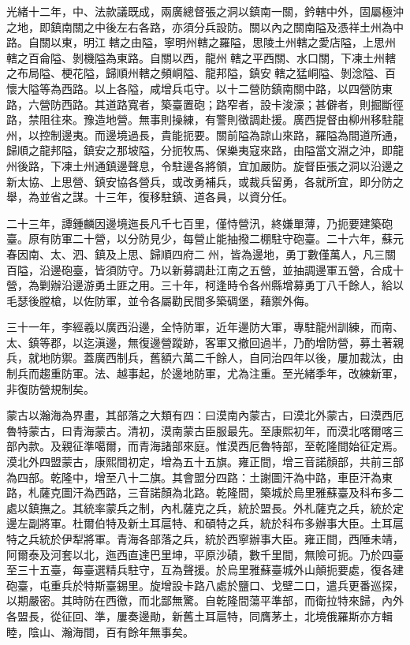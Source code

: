 \begin{pinyinscope}
光緒十二年，中、法款議既成，兩廣總督張之洞以鎮南一關，鈐轄中外，固屬極沖之地，即鎮南關之中後左右各路，亦須分兵設防。關以內之關南隘及憑祥土州為中路。自關以東，明江轄之由隘，寧明州轄之羅隘，思陵土州轄之愛店隘，上思州轄之百侖隘、剝機隘為東路。自關以西，龍州轄之平西關、水口關，下凍土州轄之布局隘、梗花隘，歸順州轄之頻峒隘、龍邦隘，鎮安轄之猛峒隘、剝淰隘、百懷大隘等為西路。以上各隘，咸增兵屯守。以十二營防鎮南關中路，以四營防東路，六營防西路。其道路寬者，築臺置砲；路窄者，設卡浚濠；甚僻者，則掘斷徑路，禁阻往來。豫造地營。無事則操練，有警則徵調赴援。廣西提督由柳州移駐龍州，以控制邊夷。而邊境過長，貴能扼要。關前隘為諒山來路，羅隘為間道所通，歸順之龍邦隘，鎮安之那坡隘，分扼牧馬、保樂夷寇來路，由隘當文淵之沖，即龍州後路，下凍土州通鎮邊聲息，令駐邊各將領，宜加嚴防。旋督臣張之洞以沿邊之新太協、上思營、鎮安協各營兵，或改勇補兵，或裁兵留勇，各就所宜，即分防之舉，為並省之謀。十三年，復移駐鎮、道各員，以資分任。

二十三年，譚鍾麟因邊境迤長凡千七百里，僅恃營汛，終嫌單薄，乃扼要建築砲臺。原有防軍二十營，以分防見少，每營止能抽撥二棚駐守砲臺。二十六年，蘇元春因南、太、泗、鎮及上思、歸順四府二州，皆為邊地，勇丁數僅萬人，凡三關百隘，沿邊砲臺，皆須防守。乃以新募調赴江南之五營，並抽調邊軍五營，合成十營，為剿辦沿邊游勇土匪之用。三十年，柯逢時令各州縣增募勇丁八千餘人，給以毛瑟後膛槍，以佐防軍，並令各屬勸民間多築碉堡，藉禦外侮。

三十一年，李經羲以廣西沿邊，全恃防軍，近年邊防大軍，專駐龍州訓練，而南、太、鎮等郡，以迄滇邊，無復邊營蹤跡，客軍又撤回過半，乃酌增防營，募土著親兵，就地防禦。蓋廣西制兵，舊額六萬二千餘人，自同治四年以後，屢加裁汰，由制兵而趨重防軍。法、越事起，於邊地防軍，尤為注重。至光緒季年，改練新軍，非復防營規制矣。

蒙古以瀚海為界畫，其部落之大類有四：曰漠南內蒙古，曰漠北外蒙古，曰漠西厄魯特蒙古，曰青海蒙古。清初，漠南蒙古臣服最先。至康熙初年，而漠北喀爾喀三部內款。及親征準噶爾，而青海諸部來庭。惟漠西厄魯特部，至乾隆間始征定焉。漠北外四盟蒙古，康熙間初定，增為五十五旗。雍正間，增三音諾顏部，共前三部為四部。乾隆中，增至八十二旗。其會盟分四路：土謝圖汗為中路，車臣汗為東路，札薩克圖汗為西路，三音諾顏為北路。乾隆間，築城於烏里雅蘇臺及科布多二處以鎮撫之。其統率蒙兵之制，內札薩克之兵，統於盟長。外札薩克之兵，統於定邊左副將軍。杜爾伯特及新土耳扈特、和碩特之兵，統於科布多辦事大臣。土耳扈特之兵統於伊犁將軍。青海各部落之兵，統於西寧辦事大臣。雍正間，西陲未靖，阿爾泰及河套以北，迤西直達巴里坤，平原沙磧，數千里間，無險可扼。乃於四臺至三十五臺，每臺選精兵駐守，互為聲援。於烏里雅蘇臺城外山顛扼要處，復各建砲臺，屯重兵於特斯臺錫里。旋增設卡路八處於鹽口、戈壁二口，遣兵更番巡探，以期嚴密。其時防在西徼，而北鄙無驚。自乾隆間蕩平準部，而衛拉特來歸，內外各盟長，從征回、準，屢奏邊勛，新舊土耳扈特，同膺茅土，北境俄羅斯亦方輯睦，陰山、瀚海間，百有餘年無事矣。


\end{pinyinscope}
